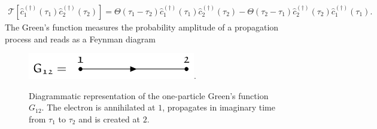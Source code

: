 \documentclass[../../main.tex]{subfiles}
\begin{document}
\begin{align}
	\mathcal{T}\left [\hat{c}^{(\dagger)}_{\mathfrak{1}}(\tau_1)\hat{c}^{(\dagger)}_{\mathfrak{2}}(\tau_2)\right ]=\Theta(\tau_1-\tau_2)\hat{c}^{(\dagger)}_{\mathfrak{1}}(\tau_1)\hat{c}^{(\dagger)}_{\mathfrak{2}}(\tau_2)-\Theta(\tau_2-\tau_1)\hat{c}^{(\dagger)}_{\mathfrak{2}}(\tau_2)\hat{c}^{(\dagger)}_{\mathfrak{1}}(\tau_1).
\end{align}
The Green's function measures the probability amplitude of a propagation process and reads as a Feynman diagram
\begin{figure}[ht!]
	\centering
	\includegraphics[scale=1.2]{../../Graphics/Diagrams/one_p_green/one_p_green}.
	\caption{Diagrammatic representation of the one-particle Green's function $G_{\mathfrak{12}}$. The electron is annihilated at $\mathfrak{1}$, propagates in imaginary time from $\tau_1$ to $\tau_2$ and is created at $\mathfrak{2}$.}
	\label{fig:one_p_green}
\end{figure}
\end{document}
